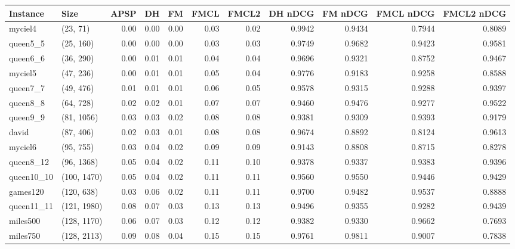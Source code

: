 \begin{tabular}{llrrrrrrrrr}
\toprule
  Instance &         Size &  APSP &   DH &   FM &  FMCL &  FMCL2 &  DH nDCG &  FM nDCG &  FMCL nDCG &  FMCL2 nDCG \\
\midrule
   myciel4 &     (23, 71) &  0.00 & 0.00 & 0.00 &  0.03 &   0.02 &   0.9942 &   0.9434 &     0.7944 &      0.8089 \\
  queen5\_5 &    (25, 160) &  0.00 & 0.00 & 0.00 &  0.03 &   0.03 &   0.9749 &   0.9682 &     0.9423 &      0.9581 \\
  queen6\_6 &    (36, 290) &  0.00 & 0.01 & 0.01 &  0.04 &   0.04 &   0.9696 &   0.9321 &     0.8752 &      0.9467 \\
   myciel5 &    (47, 236) &  0.00 & 0.01 & 0.01 &  0.05 &   0.04 &   0.9776 &   0.9183 &     0.9258 &      0.8588 \\
  queen7\_7 &    (49, 476) &  0.01 & 0.01 & 0.01 &  0.06 &   0.05 &   0.9578 &   0.9315 &     0.9288 &      0.9397 \\
  queen8\_8 &    (64, 728) &  0.02 & 0.02 & 0.01 &  0.07 &   0.07 &   0.9460 &   0.9476 &     0.9277 &      0.9522 \\
  queen9\_9 &   (81, 1056) &  0.03 & 0.03 & 0.02 &  0.08 &   0.08 &   0.9381 &   0.9309 &     0.9393 &      0.9179 \\
     david &    (87, 406) &  0.02 & 0.03 & 0.01 &  0.08 &   0.08 &   0.9674 &   0.8892 &     0.8124 &      0.9613 \\
   myciel6 &    (95, 755) &  0.03 & 0.04 & 0.02 &  0.09 &   0.09 &   0.9143 &   0.8808 &     0.8715 &      0.8278 \\
 queen8\_12 &   (96, 1368) &  0.05 & 0.04 & 0.02 &  0.11 &   0.10 &   0.9378 &   0.9337 &     0.9383 &      0.9396 \\
queen10\_10 &  (100, 1470) &  0.05 & 0.04 & 0.02 &  0.11 &   0.11 &   0.9560 &   0.9550 &     0.9446 &      0.9429 \\
  games120 &   (120, 638) &  0.03 & 0.06 & 0.02 &  0.11 &   0.11 &   0.9700 &   0.9482 &     0.9537 &      0.8888 \\
queen11\_11 &  (121, 1980) &  0.08 & 0.07 & 0.03 &  0.13 &   0.13 &   0.9496 &   0.9355 &     0.9282 &      0.9439 \\
  miles500 &  (128, 1170) &  0.06 & 0.07 & 0.03 &  0.12 &   0.12 &   0.9382 &   0.9330 &     0.9662 &      0.7693 \\
  miles750 &  (128, 2113) &  0.09 & 0.08 & 0.04 &  0.15 &   0.15 &   0.9761 &   0.9811 &     0.9007 &      0.7838 \\

\end{tabular}
